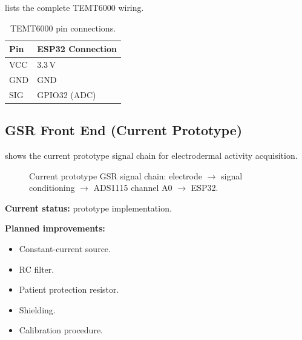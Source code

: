  lists the complete TEMT6000 wiring.

\begin{table}[H]
\centering
\caption{TEMT6000 pin connections.}
\label{tab:temt6000-wiring}
\small
\begin{tabularx}{\columnwidth}{@{}l Y@{}}
\toprule
\textbf{Pin} & \textbf{ESP32 Connection} \\
\midrule
VCC & 3.3\,V \\
GND & GND \\
SIG & GPIO32 (ADC) \\
\bottomrule
\end{tabularx}
\end{table}

\subsection{GSR Front End (Current Prototype)}
\label{sec:gsr-frontend-ch5}

 shows the current prototype signal chain for electrodermal activity acquisition.

\begin{figure}[H]
\centering
{}
\caption{Current prototype GSR signal chain: electrode $\rightarrow$ signal conditioning $\rightarrow$ ADS1115 channel A0 $\rightarrow$ ESP32.}
\label{fig:gsr-frontend-block}
\end{figure}

\begin{requirementbox}
\textbf{Current status:} prototype implementation.
\end{requirementbox}

\begin{futureworkbox}
\textbf{Planned improvements:}
\begin{itemize}
    \item Constant-current source.
    \item RC filter.
    \item Patient protection resistor.
    \item Shielding.
    \item Calibration procedure.
\end{itemize}
\end{futureworkbox}

